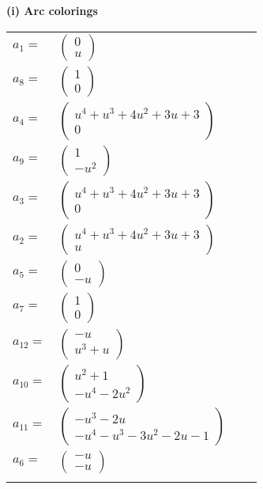 \documentclass[1p]{elsarticle_modified}
\theoremstyle{definition}
\begin{document}
\flushleft \textbf{(i) Arc colorings}\\
\begin{tabular}{m{7pt} m{180pt} m{7pt} m{180pt} }
\flushright $a_{1}=$&$\begin{pmatrix}0\\u\end{pmatrix}$ \\
\flushright $a_{8}=$&$\begin{pmatrix}1\\0\end{pmatrix}$ \\
\flushright $a_{4}=$&$\begin{pmatrix}u^4+u^3+4 u^2+3 u+3\\0\end{pmatrix}$ \\
\flushright $a_{9}=$&$\begin{pmatrix}1\\- u^2\end{pmatrix}$ \\
\flushright $a_{3}=$&$\begin{pmatrix}u^4+u^3+4 u^2+3 u+3\\0\end{pmatrix}$ \\
\flushright $a_{2}=$&$\begin{pmatrix}u^4+u^3+4 u^2+3 u+3\\u\end{pmatrix}$ \\
\flushright $a_{5}=$&$\begin{pmatrix}0\\- u\end{pmatrix}$ \\
\flushright $a_{7}=$&$\begin{pmatrix}1\\0\end{pmatrix}$ \\
\flushright $a_{12}=$&$\begin{pmatrix}- u\\u^3+u\end{pmatrix}$ \\
\flushright $a_{10}=$&$\begin{pmatrix}u^2+1\\- u^4-2 u^2\end{pmatrix}$ \\
\flushright $a_{11}=$&$\begin{pmatrix}- u^3-2 u\\- u^4- u^3-3 u^2-2 u-1\end{pmatrix}$ \\
\flushright $a_{6}=$&$\begin{pmatrix}- u\\- u\end{pmatrix}$\\&\end{tabular}
\end{document}
